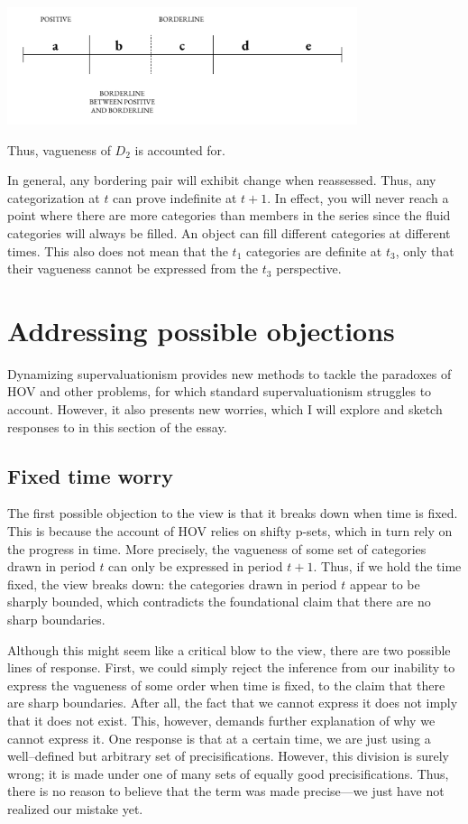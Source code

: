 \begin{center}
    \includegraphics[width=0.77\textwidth]{papers/figures/2-6.pdf}
  \end{center}
Thus, vagueness of \(D_{2}\) is accounted for.

In general, any bordering pair will exhibit change when reassessed.
Thus, any categorization at $t$ can prove indefinite at $t+1$.
In effect, you will never reach a point where there are more categories
than members in the series since the fluid categories will always be
filled. An object can fill different categories at different times. This
also does not mean that the \(t_{1}\) categories are definite at
\(t_{3}\), only that their vagueness cannot be expressed from the
\(t_{3}\) perspective.

\section{Addressing possible objections}

Dynamizing supervaluationism provides new methods to tackle the
paradoxes of HOV and other problems, for which standard
supervaluationism struggles to account. However, it also presents new
worries, which I will explore and sketch responses to in this section of
the essay.

\subsection{Fixed time worry}

The first possible objection to the view is that it breaks down when
time is fixed. This is because the account of HOV relies on shifty
p-sets, which in turn rely on the progress in time. More precisely, the
vagueness of some set of categories drawn in period $t$ can only be
expressed in period $t+1$. Thus, if we hold the time fixed, the
view breaks down: the categories drawn in period $t$ appear to be
sharply bounded, which contradicts the foundational claim that there are
no sharp boundaries.

Although this might seem like a critical blow to the view, there are two
possible lines of response. First, we could simply reject the inference
from our inability to express the vagueness of some order when time is
fixed, to the claim that there are sharp boundaries. After all, the fact
that we cannot express it does not imply that it does not exist. This,
however, demands further explanation of why we cannot express it. One
response is that at a certain time, we are just using a well--defined but
arbitrary set of precisifications. However, this division is surely
wrong; it is made under one of many sets of equally good
precisifications. Thus, there is no reason to believe that the term was
made precise---we just have not realized our mistake yet.

